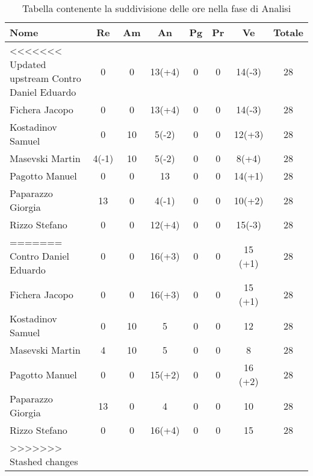 \documentclass[../piano_di_progetto.tex]{subfiles}
\begin{document}
\begin{table}[!ht]
	\centering
	\begin{tabular}{|l|c|c|c|c|c|c|c|}
	\hline
	\rowcolor{lightgray}
	\textbf{Nome} & \textbf{Re} & \textbf{Am} & \textbf{An} & \textbf{Pg}  & \textbf{Pr}   & \textbf{Ve} & \textbf{Totale}\\
	\hline
<<<<<<< Updated upstream
		Contro Daniel Eduardo & 0 & 0 & 13(+4) & 0 & 0 & 14(-3) & 28 \\
		Fichera Jacopo & 0 & 0 & 13(+4) & 0 & 0 & 14(-3) & 28 \\
		Kostadinov Samuel & 0 & 10 & 5(-2) & 0 & 0 & 12(+3) & 28 \\		
		Masevski Martin & 4(-1) & 10 & 5(-2) & 0 & 0 & 8(+4) & 28 \\
		Pagotto Manuel & 0 & 0 & 13 & 0 & 0 & 14(+1) & 28 \\			
		Paparazzo Giorgia & 13 & 0 & 4(-1) & 0 & 0 & 10(+2) & 28 \\
		Rizzo Stefano & 0 & 0 & 12(+4) & 0 & 0 & 15(-3) & 28 \\
=======
		Contro Daniel Eduardo & 0 & 0 & 16(+3) & 0 & 0 & 15 (+1) & 28 \\
	\hline
		Fichera Jacopo &        0 & 0 & 16(+3) & 0 & 0 & 15 (+1) & 28 \\
	\hline
		Kostadinov Samuel &     0 & 10 & 5     & 0 & 0 & 12 & 28 \\			
	\hline
		Masevski Martin &       4 & 10 & 5     & 0 & 0 & 8 & 28 \\
	\hline
		Pagotto Manuel &        0 & 0 & 15(+2) & 0 & 0 & 16 (+2) & 28 \\			
	\hline
		Paparazzo Giorgia &     13 & 0 & 4     & 0 & 0 & 10 & 28 \\
	\hline
		Rizzo Stefano &         0 & 0 & 16(+4) & 0 & 0 & 15 & 28 \\
>>>>>>> Stashed changes
	\hline	
	\end{tabular}
	\caption{Tabella contenente la suddivisione delle ore nella fase di Analisi}
\end{table}
\end{document}
